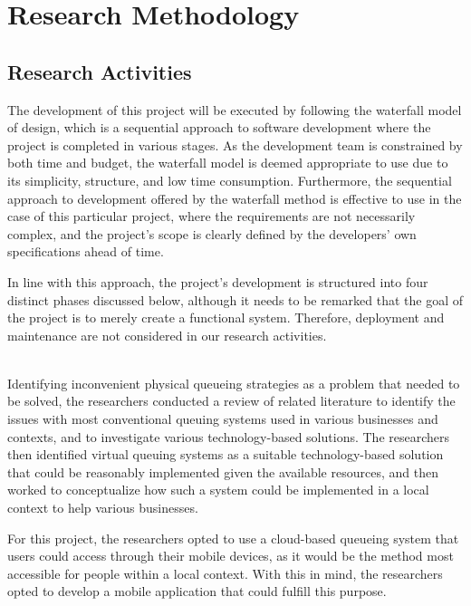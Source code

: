 \chapter{Research Methodology}

\section{Research Activities}

The development of this project will be executed by following the waterfall model of design, which is a sequential approach to software development where the project is completed in various stages. As the development team is constrained by both time and budget, the waterfall model is deemed appropriate to use due to its simplicity, structure, and low time consumption. Furthermore, the sequential approach to development offered by the waterfall method is effective to use in the case of this particular project, where the requirements are not necessarily complex, and the project’s scope is clearly defined by the developers’ own specifications ahead of time.

In line with this approach, the project’s development is structured into four distinct phases discussed below, although it needs to be remarked that the goal of the project is to merely create a functional system. Therefore, deployment and maintenance are not considered in our research activities.

 \\
Identifying inconvenient physical queueing strategies as a problem that needed to be solved, the researchers conducted a review of related literature to identify the issues with most conventional queuing systems used in various businesses and contexts, and to investigate various technology-based solutions. The researchers then identified virtual queuing systems as a suitable technology-based solution that could be reasonably implemented given the available resources, and then worked to conceptualize how such a system could be implemented in a local context to help various businesses.

For this project, the researchers opted to use a cloud-based queueing system that users could access through their mobile devices, as it would be the method most accessible for people within a local context. With this in mind, the researchers opted to develop a mobile application that could fulfill this purpose.

